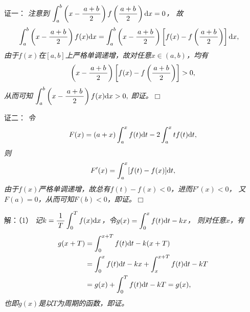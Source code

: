 \begin{frame}
	\linespread{1.5}
	
	\pause
	\small 证一：\it 
	注意到
	$\displaystyle\int_a^b\left(x-\displaystyle\frac{\,{a+b}\,}{\,{2}\,}\right)f\left(\displaystyle\frac{\,{a+b}\,}{\,{2}\,}\right)\mathrm{d} x=0$，
	故
	\begin{align*}
		\displaystyle\int_a^b\left(x-\displaystyle\frac{\,{a+b}\,}{\,{2}\,}\right)f(x)\mathrm{d} x
		&=\displaystyle\int_a^b\left(x-\displaystyle\frac{\,{a+b}\,}{\,{2}\,}\right)\left[f(x)
		-f\left(\displaystyle\frac{\,{a+b}\,}{\,{2}\,}\right)\right]\mathrm{d} x,
	\end{align*}
	由于$f(x)$在$[a,b]$上严格单调递增，故对任意$x\in(a,b)$，均有
	$$\left(x-\displaystyle\frac{\,{a+b}\,}{\,{2}\,}\right)\left[f(x)
	-f\left(\displaystyle\frac{\,{a+b}\,}{\,{2}\,}\right)\right]>0,$$
	从而可知
	$\displaystyle\int_a^b\left(x-\displaystyle\frac{\,{a+b}\,}{\,{2}\,}\right)f(x)\mathrm{d} x>0,$
	即证。\hfill$\Box$
\end{frame}

\begin{frame}
	\linespread{1.5}
	
	\pause
	\small 证二：\it 
	令
	$$F(x)=(a+x)\displaystyle\int_a^xf(t)\mathrm{d} t-2\displaystyle\int_a^xtf(t)\mathrm{d} t,$$
	则
	$$F'(x)=\displaystyle\int_a^x[f(t)-f(x)]\mathrm{d} t,$$
	由于$f(x)$严格单调递增，故总有$f(t)-f(x)<0$，进而$F'(x)<0$，
	又$F(a)=0$，从而可知$F(b)<0$，即证。\hfill$\Box$
\end{frame}

\begin{frame}
	\linespread{2}
\end{frame}

\begin{frame}
	\linespread{1.5}
	\small 解：（1）\it 
	记$k=\displaystyle\frac{\,{1}\,}{\,{T}\,}\displaystyle\int_0^Tf(x)\mathrm{d} x$，令$g(x)=\displaystyle\int_0^xf(t)\mathrm{d} t-kx$，
	则对任意$x$，有
	\begin{align*}
		g(x+T)
		&=\displaystyle\int_0^{x+T}f(t)\mathrm{d} t-k(x+T)\\
		&=\displaystyle\int_0^xf(t)\mathrm{d} t-kx+\displaystyle\int_x^{x+T}f(t)\mathrm{d} t-kT\\
		&=g(x)+\displaystyle\int_0^{T}f(t)\mathrm{d} t-kT=g(x),
	\end{align*}
	也即$g(x)$是以$T$为周期的函数，即证。
\end{frame}

